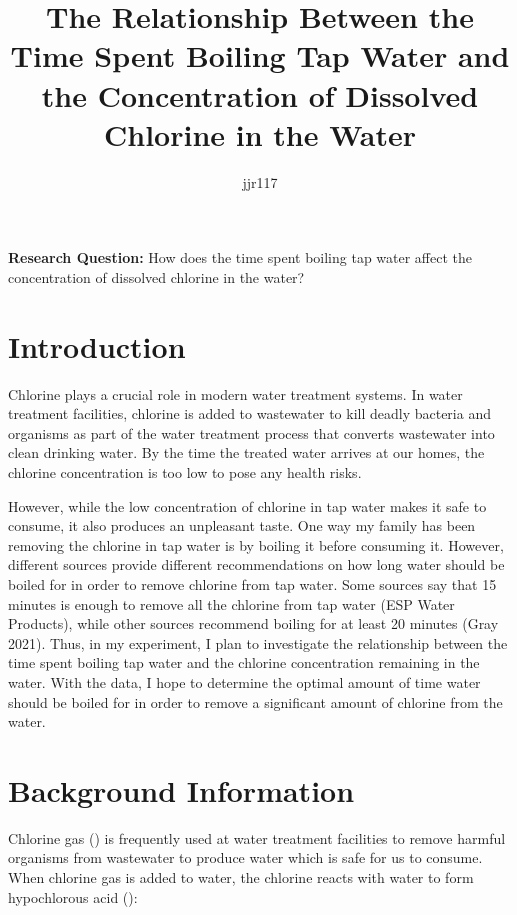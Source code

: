 \documentclass[11pt]{article}
\title{The Relationship Between the Time Spent Boiling Tap Water and the Concentration of Dissolved Chlorine in the Water}
\author{jjr117}
\date{}
\begin{document}
\begin{titlingpage}
	\maketitle
\end{titlingpage}

\noindent\textbf{Research Question:} How does the time spent boiling tap water affect the concentration of dissolved chlorine in the water?

\section{Introduction}

Chlorine plays a crucial role in modern water treatment systems. In water treatment facilities, chlorine is added to wastewater to kill deadly bacteria and organisms as part of the water treatment process that converts wastewater into clean drinking water. By the time the treated water arrives at our homes, the chlorine concentration is too low to pose any health risks.

However, while the low concentration of chlorine in tap water makes it safe to consume, it also produces an unpleasant taste. One way my family has been removing the chlorine in tap water is by boiling it before consuming it. However, different sources provide different recommendations on how long water should be boiled for in order to remove chlorine from tap water. Some sources say that 15 minutes is enough to remove all the chlorine from tap water (ESP Water Products), while other sources recommend boiling for at least 20 minutes (Gray 2021). Thus, in my experiment, I plan to investigate the relationship between the time spent boiling tap water and the chlorine concentration remaining in the water. With the data, I hope to determine the optimal amount of time water should be boiled for in order to remove a significant amount of chlorine from the water.

\section{Background Information}

Chlorine gas () is frequently used at water treatment facilities to remove harmful organisms from wastewater to produce water which is safe for us to consume. When chlorine gas is added to water, the chlorine reacts with water to form hypochlorous acid ():
\end{document}
